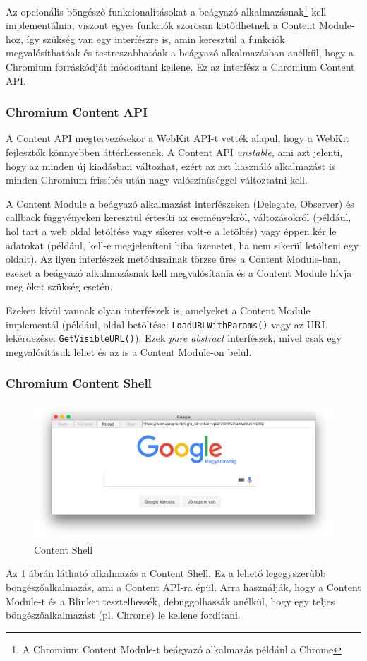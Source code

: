 \documentclass[12pt]{report}
\begin{document}
Az opcionális böngésző funkcionalitásokat a beágyazó
alkalmazásnak\footnote{A Chromium Content Module-t beágyazó alkalmazás például a Chrome}
kell implementálnia, viszont egyes funkciók szorosan kötődhetnek a Content Module-hoz,
így szükség van egy interfészre is, amin keresztül a funkciók megvalósíthatóak és
testreszabhatóak a beágyazó alkalmazásban anélkül, hogy a Chromium forráskódját módosítani
kellene. Ez az interfész a Chromium Content API.

\subsubsection{Chromium Content API}
A Content API megtervezésekor a WebKit API-t vették alapul, hogy a WebKit fejlesztők
könnyebben áttérhessenek. A Content API \textit{unstable}, ami azt jelenti, hogy az minden
új kiadásban változhat, ezért az azt használó alkalmazást is minden Chromium frissítés után
nagy valószínűséggel változtatni kell.

A Content Module a beágyazó alkalmazást interfészeken (Delegate, Observer)
és callback függvényeken keresztül értesíti az eseményekről, változásokról (például,
hol tart a web oldal letöltése vagy sikeres volt-e a letöltés) vagy éppen
kér le adatokat (például, kell-e megjeleníteni hiba üzenetet, ha nem sikerül letölteni egy
oldalt). Az ilyen interfészek metódusainak törzse üres a Content Module-ban, ezeket a
beágyazó alkalmazásnak kell megvalósítania és a Content Module hívja meg őket szükség esetén.

Ezeken kívül vannak olyan interfészek is, amelyeket a Content Module implementál
(például, oldal betöltése: \texttt{LoadURLWithParams()} vagy az URL lekérdezése:
\texttt{GetVisibleURL()}).
Ezek \textit{pure abstract} interfészek, mivel csak egy megvalósításuk lehet
és az is a Content Module-on belül. \cite{bib:chromium-content-api}

\subsubsection{Chromium Content Shell}
\begin{figure}[h]
    \centering
    \includegraphics[scale=0.40]{content-shell}
    \caption{
        \label{fig:content-shell}
        Content Shell
    }
\end{figure}
Az \ref{fig:content-shell} ábrán látható alkalmazás a Content Shell. Ez a lehető
legegyszerűbb böngészőalkalmazás, ami a Content API-ra épül. Arra használják, hogy a
Content Module-t és a Blinket tesztelhessék, debuggolhassák anélkül, hogy egy teljes
böngészőalkalmazást (pl. Chrome) le kellene fordítani.
\end{document}
